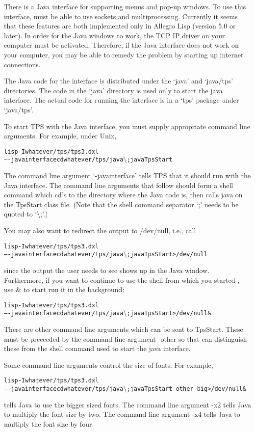 There is a Java interface for {\TPS} supporting menus and pop-up
windows.
To use this interface, {\TPS} must be able to use sockets
and multiprocessing.
Currently it seems that these features are both
implemented only in
Allegro Lisp (version 5.0 or later).
In order for the Java windows to work, the
TCP IP driver on your computer must be activated.  Therefore, if the
Java interface does not work on your computer, you may be able to
remedy the problem by starting up internet connections.

The Java code for the interface is distributed under
the `java' and `java/tps' directories.  The code
in the `java' directory is used only to start the java
{\TPS} interface.  The actual code for running the interface
is in a `tps' package under `java/tps'.

To start TPS with the Java interface, you must supply
appropriate command line arguments.  For example, under Unix,
\begin{alltt}
lisp -I whatever/tps/tps3.dxl
     -- -javainterface cd whatever/tps/java \(\setminus\); java TpsStart
\end{alltt}
The command line argument `-javainterface' tells TPS that it should
run with the Java interface.  The command line arguments that follow
should form a shell command which cd's to the directory where the Java
code is, then calls java on the TpsStart class file.  (Note that the
shell command separator `;' needs to be quoted to `\(\setminus\);'.)

You may also
want to redirect the \TPS output to /dev/null, i.e., call
\begin{alltt}
lisp -I whatever/tps/tps3.dxl
     -- -javainterface cd whatever/tps/java \(\setminus\); java TpsStart > /dev/null
\end{alltt}
since the output the user needs to see shows up in the Java window.
Furthermore, if you want to continue to use the shell from which you
started {\TPS}, use \& to start run it in the background:
\begin{alltt}
lisp -I whatever/tps/tps3.dxl
     -- -javainterface cd whatever/tps/java \(\setminus\); java TpsStart > /dev/null \&
\end{alltt}

There are other command line arguments which can be sent to TpsStart.
These must be preceeded by the command line argument -other so
that {\TPS} can distinguish these from the shell command used to
start the java interface.

Some command line arguments control the size of fonts.
For example,
\begin{alltt}
lisp -I whatever/tps/tps3.dxl
     -- -javainterface cd whatever/tps/java \(\setminus\); java TpsStart -other -big > /dev/null \&
\end{alltt}
tells Java to use the bigger sized fonts.  The command line argument
-x2 tells Java to multiply the font size by two.
The command line argument -x4 tells Java to multiply the font size by four.

